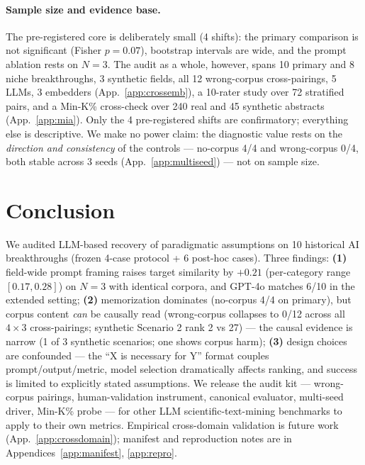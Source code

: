 \documentclass[11pt]{article}
\begin{document}
\paragraph{Sample size and evidence base.}
The pre-registered core is deliberately small (4 shifts): the primary comparison is not significant (Fisher $p = 0.07$), bootstrap intervals are wide, and the prompt ablation rests on $N{=}3$. The audit as a whole, however, spans 10 primary and 8 niche breakthroughs, 3 synthetic fields, all 12 wrong-corpus cross-pairings, 5 LLMs, 3 embedders (App.~\ref{app:crossemb}), a 10-rater study over 72 stratified pairs, and a Min-K\% cross-check over 240 real and 45 synthetic abstracts (App.~\ref{app:mia}). Only the 4 pre-registered shifts are confirmatory; everything else is descriptive. We make no power claim: the diagnostic value rests on the \emph{direction and consistency} of the controls --- no-corpus 4/4 and wrong-corpus 0/4, both stable across 3 seeds (App.~\ref{app:multiseed}) --- not on sample size.

\section{Conclusion}

We audited LLM-based recovery of paradigmatic assumptions on 10 historical AI breakthroughs (frozen 4-case protocol + 6 post-hoc cases). Three findings: \textbf{(1)} field-wide prompt framing raises target similarity by $+0.21$ (per-category range $[0.17, 0.28]$) on $N{=}3$ with identical corpora, and GPT-4o matches 6/10 in the extended setting; \textbf{(2)} memorization dominates (no-corpus 4/4 on primary), but corpus content \emph{can} be causally read (wrong-corpus collapses to 0/12 across all $4{\times}3$ cross-pairings; synthetic Scenario 2 rank 2 vs 27) --- the causal evidence is narrow (1 of 3 synthetic scenarios; one shows corpus harm); \textbf{(3)} design choices are confounded --- the ``X is necessary for Y'' format couples prompt/output/metric, model selection dramatically affects ranking, and success is limited to explicitly stated assumptions. We release the audit kit --- wrong-corpus pairings, human-validation instrument, canonical evaluator, multi-seed driver, Min-K\% probe --- for other LLM scientific-text-mining benchmarks to apply to their own metrics. Empirical cross-domain validation is future work (App.~\ref{app:crossdomain}); manifest and reproduction notes are in Appendices~\ref{app:manifest}, \ref{app:repro}.
\end{document}
